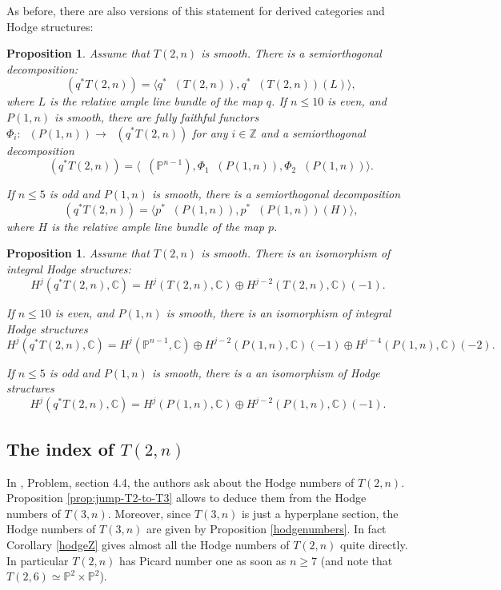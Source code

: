 \documentclass[JEP,XML,SOM,Unicode,NoEqCountersInSection]{cedram}
\theoremstyle{plain}
\newtheorem{prop}[theorem]{Proposition}
\theoremstyle{definition}
\newcommand{\cat}[1]{\mathsf{#1}}
\newcommand{\sod}[1]{\langle #1 \rangle}
\DeclareMathOperator{\Db}{{\cat{D}^{\mathrm{b}}}}
\newcommand{\ZZ}{\mathbb{Z}}
\newcommand{\CC}{\mathbb{C}}
\newcommand{\PP}{\mathbb{P}}
\begin{document}
As before, there are also versions of this statement for derived categories and Hodge structures:

\begin{prop}\label{prop:decoforpeski}
Assume that $T(2,n)$ is smooth.
There is a semiorthogonal decomposition:
\begin{equation*}
\Db(q^*T(2,n))=\sod{q^* \Db(T(2,n)),q^*\Db(T(2,n))(L)},
\end{equation*}
where $L$ is the relative ample line bundle of the map $q$.
If $n\le 10$ is even, and $P(1,n)$ is smooth, there are fully faithful functors $\Phi_i:\Db(P(1,n)) \to \Db(q^*T(2,n))$ for any $i \in \ZZ$ and a semiorthogonal decomposition
\begin{equation*}
\Db(q^*T(2,n))=\sod{\Db(\PP^{n-1}),\Phi_1\Db(P(1,n)),\Phi_2\Db(P(1,n))}.
\end{equation*}

If $n\le 5$ is odd and $P(1,n)$ is smooth, there is a semiorthogonal decomposition
\begin{equation*}
\Db(q^*T(2,n))=\sod{p^*\Db(P(1,n)),p^*\Db(P(1,n))(H)},
\end{equation*}
where $H$ is the relative ample line bundle of the map $p$.
\end{prop}

\begin{prop}\label{prop:peski-Hodge}
Assume that $T(2,n)$ is smooth.
There is an isomorphism of integral Hodge structures:
\begin{equation*}
H^j(q^*T(2,n),\CC)= H^j(T(2,n),\CC) \oplus H^{j-2}(T(2,n),\CC)(-1).
\end{equation*}

If $n\le 10$ is even, and $P(1,n)$ is smooth, there is an isomorphism of integral Hodge structures
\[
H^j(q^*T(2,n),\CC)=H^j(\PP^{n-1},\CC) \oplus H^{j-2}(P(1,n),\CC)(-1) \oplus H^{j-4}(P(1,n),\CC)(-2).
\]

If $n\le 5$ is odd and $P(1,n)$ is smooth, there is a an isomorphism of Hodge structures%
\begin{equation*}
H^j(q^*T(2,n),\CC)=H^j(P(1,n),\CC) \oplus H^{j-2}(P(1,n),\CC)(-1).
\end{equation*}
\end{prop}

\subsection{The index of $T(2,n)$}

In \cite{dpfmr}, Problem, section 4.4, the authors ask about the Hodge numbers of $T(2,n)$.
Proposition \ref{prop:jump-T2-to-T3} allows to deduce them from the Hodge numbers of $T(3,n)$.
Moreover, since $T(3,n)$ is just a hyperplane section, the Hodge numbers of $T(3,n)$ are given
by Proposition \ref{hodgenumbers}. In fact Corollary \ref{hodgeZ} gives almost all the Hodge
numbers of $T(2,n)$ quite directly.
In particular $T(2,n)$ has Picard number one as soon as $n\ge 7$ (and note that $T(2,6)\simeq
\PP^2\times\PP^2$).
\end{document}
